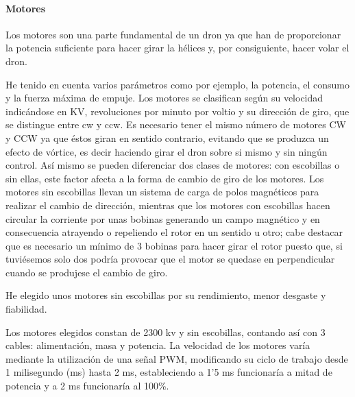 
\paragraph{Motores}
\label{SSS:Motores}

Los motores son una parte fundamental de un dron ya que han de proporcionar la potencia suficiente para hacer girar la hélices y, por consiguiente, hacer volar el dron. 
                
 He tenido en cuenta varios parámetros como por ejemplo, la potencia, el consumo y la fuerza máxima de empuje. 
 Los motores se clasifican según su velocidad indicándose en KV, revoluciones por minuto por voltio y su dirección de giro, que se distingue entre \ac{cw} y \ac{ccw}. Es necesario tener el mismo número de motores CW y CCW ya que éstos giran en sentido contrario, evitando que se produzca un efecto de vórtice, es decir haciendo girar el dron sobre si mismo y sin ningún control. \linebreak Así mismo se pueden diferenciar dos clases de motores: con escobillas o sin ellas, este factor afecta a la forma de cambio de giro de los motores. Los motores sin escobillas llevan un sistema de carga de polos magnéticos para realizar el cambio de dirección, mientras que los motores con escobillas hacen circular la corriente por unas bobinas generando un campo magnético y en consecuencia atrayendo o repeliendo el rotor en un sentido u otro; cabe destacar que es necesario un mínimo de 3 bobinas para hacer girar el rotor puesto que, si tuviésemos solo dos podría provocar que el motor se quedase en perpendicular cuando se produjese el cambio de giro.

 He elegido unos motores sin escobillas por su rendimiento, menor desgaste y fiabilidad. 
% 
                
 Los motores elegidos constan de 2300 \ac{kv} y sin escobillas, contando así con 3 cables: alimentación, masa y potencia. La velocidad de los motores varía mediante la utilización de una señal PWM, modificando su ciclo de trabajo desde 1 milisegundo (ms) hasta 2 ms, estableciendo a 1'5 ms funcionaría a mitad de potencia y a 2 ms funcionaría al 100\%.
 
